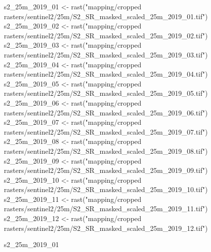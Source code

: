 \documentclass[
  letterpaper,
  DIV=11,
  numbers=noendperiod]{scrartcl}
\newenvironment{Shaded}{\begin{snugshade}}{\end{snugshade}}
\newcommand{\FunctionTok}[1]{\textcolor[rgb]{0.28,0.35,0.67}{#1}}
\newcommand{\NormalTok}[1]{\textcolor[rgb]{0.00,0.23,0.31}{#1}}
\newcommand{\OtherTok}[1]{\textcolor[rgb]{0.00,0.23,0.31}{#1}}
\newcommand{\StringTok}[1]{\textcolor[rgb]{0.13,0.47,0.30}{#1}}
\begin{document}
\begin{Shaded}
\begin{Highlighting}[]
\NormalTok{s2\_25m\_2019\_01 }\OtherTok{\textless{}{-}} \FunctionTok{rast}\NormalTok{(}\StringTok{"mapping/cropped rasters/sentinel2/25m/S2\_SR\_masked\_scaled\_25m\_2019\_01.tif"}\NormalTok{)}
\NormalTok{s2\_25m\_2019\_02 }\OtherTok{\textless{}{-}} \FunctionTok{rast}\NormalTok{(}\StringTok{"mapping/cropped rasters/sentinel2/25m/S2\_SR\_masked\_scaled\_25m\_2019\_02.tif"}\NormalTok{)}
\NormalTok{s2\_25m\_2019\_03 }\OtherTok{\textless{}{-}} \FunctionTok{rast}\NormalTok{(}\StringTok{"mapping/cropped rasters/sentinel2/25m/S2\_SR\_masked\_scaled\_25m\_2019\_03.tif"}\NormalTok{)}
\NormalTok{s2\_25m\_2019\_04 }\OtherTok{\textless{}{-}} \FunctionTok{rast}\NormalTok{(}\StringTok{"mapping/cropped rasters/sentinel2/25m/S2\_SR\_masked\_scaled\_25m\_2019\_04.tif"}\NormalTok{)}
\NormalTok{s2\_25m\_2019\_05 }\OtherTok{\textless{}{-}} \FunctionTok{rast}\NormalTok{(}\StringTok{"mapping/cropped rasters/sentinel2/25m/S2\_SR\_masked\_scaled\_25m\_2019\_05.tif"}\NormalTok{)}
\NormalTok{s2\_25m\_2019\_06 }\OtherTok{\textless{}{-}} \FunctionTok{rast}\NormalTok{(}\StringTok{"mapping/cropped rasters/sentinel2/25m/S2\_SR\_masked\_scaled\_25m\_2019\_06.tif"}\NormalTok{)}
\NormalTok{s2\_25m\_2019\_07 }\OtherTok{\textless{}{-}} \FunctionTok{rast}\NormalTok{(}\StringTok{"mapping/cropped rasters/sentinel2/25m/S2\_SR\_masked\_scaled\_25m\_2019\_07.tif"}\NormalTok{)}
\NormalTok{s2\_25m\_2019\_08 }\OtherTok{\textless{}{-}} \FunctionTok{rast}\NormalTok{(}\StringTok{"mapping/cropped rasters/sentinel2/25m/S2\_SR\_masked\_scaled\_25m\_2019\_08.tif"}\NormalTok{)}
\NormalTok{s2\_25m\_2019\_09 }\OtherTok{\textless{}{-}} \FunctionTok{rast}\NormalTok{(}\StringTok{"mapping/cropped rasters/sentinel2/25m/S2\_SR\_masked\_scaled\_25m\_2019\_09.tif"}\NormalTok{)}
\NormalTok{s2\_25m\_2019\_10 }\OtherTok{\textless{}{-}} \FunctionTok{rast}\NormalTok{(}\StringTok{"mapping/cropped rasters/sentinel2/25m/S2\_SR\_masked\_scaled\_25m\_2019\_10.tif"}\NormalTok{)}
\NormalTok{s2\_25m\_2019\_11 }\OtherTok{\textless{}{-}} \FunctionTok{rast}\NormalTok{(}\StringTok{"mapping/cropped rasters/sentinel2/25m/S2\_SR\_masked\_scaled\_25m\_2019\_11.tif"}\NormalTok{)}
\NormalTok{s2\_25m\_2019\_12 }\OtherTok{\textless{}{-}} \FunctionTok{rast}\NormalTok{(}\StringTok{"mapping/cropped rasters/sentinel2/25m/S2\_SR\_masked\_scaled\_25m\_2019\_12.tif"}\NormalTok{)}

\NormalTok{s2\_25m\_2019\_01}
\end{Highlighting}
\end{Shaded}
\end{document}
